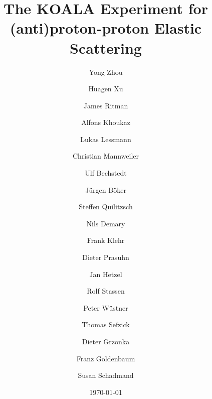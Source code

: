 \documentclass[number,5p]{elsarticle}
\begin{document}
\begin{frontmatter}	
  \title{The KOALA Experiment for (anti)proton-proton Elastic Scattering}
  \date{\today}

  \author[ikp]{Yong Zhou}
  \author[ikp]{Huagen Xu}
  \author[ikp,bochum,gsi]{James Ritman}

  \author[muenster]{Alfons Khoukaz}
  \author[muenster]{Lukas Lessmann}
  \author[muenster]{Christian Mannweiler}

  \author[ikp]{Ulf Bechstedt}
  \author[ikp]{Jürgen Böker}
  \author[ikp]{Steffen Quilitzsch}
  \author[ikp]{Nils Demary}
  \author[ikp]{Frank Klehr}

  \author[ikp]{Dieter Prasuhn}
  \author[ikp]{Jan Hetzel}
  \author[ikp]{Rolf Stassen}

  \author[zea]{Peter Wüstner}
  \author[ikp]{Thomas Sefzick}

  \author[ikp]{Dieter Grzonka}
  \author[ikp]{Franz Goldenbaum}
  \author[ikp]{Susan Schadmand}


  \address[ikp]{Institut für Kernphysik, Forschungszentrum Jülich, Jülich, 52425, Germany}
  \address[bochum]{Ruhr-Universität Bochum, Bochum, 44780, Germany}
  \address[gsi]{GSI Helmholtzzentrum für Schwerionenforschung GmbH, Darmstadt, 64291, Germany}
  \address[muenster]{Institut für Kernphysik, Universität Münster, Münster, 48149, Germany}
  \address[zea]{Zentralinstitut für Engineering, Elektronik und Analytik, Forschungszentrum Jülich, Jülich, 52425, Germany}


  \begin{abstract}



\end{abstract}
\end{frontmatter}
\end{document}
